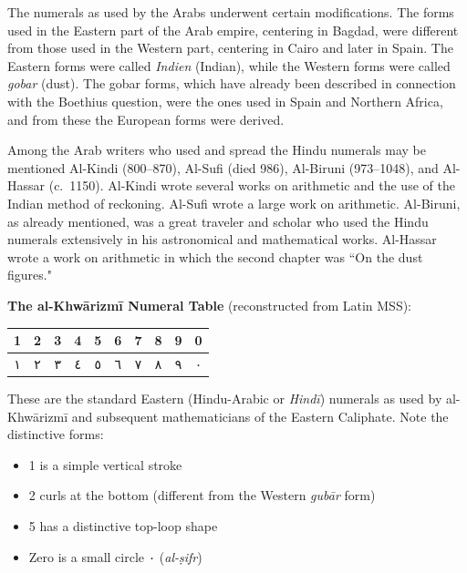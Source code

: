 \documentclass[11pt,a4paper]{article}
\newcommand{\ar}[1]{{\arabicfont #1}}
\newenvironment{enhancednote}{%
  \begin{tcolorbox}[colback=enhancedbg,colframe=notecolor,boxrule=1pt,
    left=10pt,right=10pt,top=8pt,bottom=8pt,
    title={\textbf{Enhanced Edition Note}},fonttitle=\bfseries\color{notecolor}]
}{\end{tcolorbox}}
\begin{document}
The numerals as used by the Arabs underwent certain modifications. The forms used in the Eastern part of the Arab empire, centering in Bagdad, were different from those used in the Western part, centering in Cairo and later in Spain. The Eastern forms were called \textit{Indien} (Indian), while the Western forms were called \textit{gobar} (dust). The gobar forms, which have already been described in connection with the Boethius question, were the ones used in Spain and Northern Africa, and from these the European forms were derived.

Among the Arab writers who used and spread the Hindu numerals may be mentioned Al-Kindi (800--870), Al-Sufi (died 986), Al-Biruni (973--1048), and Al-Hassar (c.~1150). Al-Kindi wrote several works on arithmetic and the use of the Indian method of reckoning. Al-Sufi wrote a large work on arithmetic. Al-Biruni, as already mentioned, was a great traveler and scholar who used the Hindu numerals extensively in his astronomical and mathematical works. Al-Hassar wrote a work on arithmetic in which the second chapter was ``On the dust figures."

\begin{enhancednote}
\textbf{The al-Khw\=arizm\=i Numeral Table} (reconstructed from Latin MSS):

\begin{center}
\begin{tabular}{|c|c|c|c|c|c|c|c|c|c|}
\hline
\textbf{1} & \textbf{2} & \textbf{3} & \textbf{4} & \textbf{5} & \textbf{6} & \textbf{7} & \textbf{8} & \textbf{9} & \textbf{0} \\
\hline
\ar{١} & \ar{٢} & \ar{٣} & \ar{٤} & \ar{٥} & \ar{٦} & \ar{٧} & \ar{٨} & \ar{٩} & \ar{٠} \\
\hline
\end{tabular}
\end{center}

These are the standard Eastern (Hindu-Arabic or \textit{Hind\=i}) numerals as used by al-Khw\=arizm\=i and subsequent mathematicians of the Eastern Caliphate. Note the distinctive forms:
\begin{itemize}[leftmargin=1.5em,itemsep=0pt]
  \item 1 is a simple vertical stroke
  \item 2 curls at the bottom (different from the Western \textit{gub\=ar} form)
  \item 5 has a distinctive top-loop shape
  \item Zero is a small circle \ar{٠} (\textit{al-\d{s}ifr})
\end{itemize}
\end{enhancednote}
\end{document}
